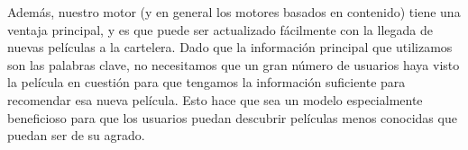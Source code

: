 Además, nuestro motor (y en general los motores basados en contenido) tiene una ventaja principal, y es que puede ser actualizado fácilmente con la llegada de nuevas películas a la cartelera. Dado que la información principal que utilizamos son las palabras clave, no necesitamos que un gran número de usuarios haya visto la película en cuestión para que tengamos la información suficiente para recomendar esa nueva película. Esto hace que sea un modelo especialmente beneficioso para que los usuarios puedan descubrir películas menos conocidas que puedan ser de su agrado.



    
